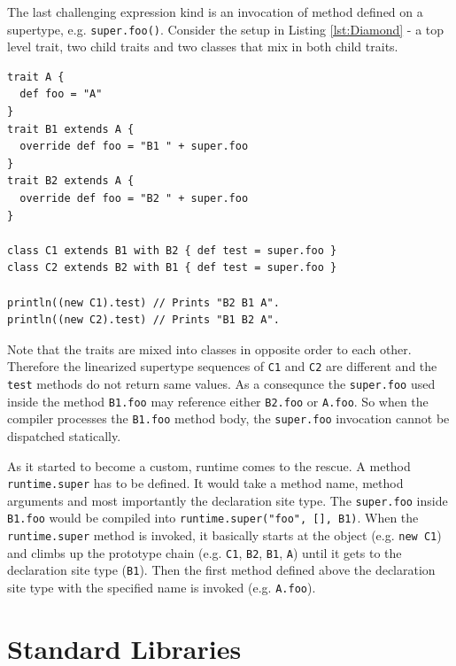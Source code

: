 \documentclass[12pt,a4paper]{report}
\begin{document}
The last challenging expression kind is an invocation of method defined on a supertype, e.g. \texttt{super.foo()}. Consider the setup in Listing \ref{lst:Diamond} - a top level trait, two child traits and two classes that mix in both child traits.

\begin{minipage}{\linewidth}
\begin{lstlisting}[caption={The \texttt{super} keyword non-static behavior example.},label={lst:Diamond}]
trait A { 
  def foo = "A" 
}
trait B1 extends A { 
  override def foo = "B1 " + super.foo
}
trait B2 extends A { 
  override def foo = "B2 " + super.foo
}

class C1 extends B1 with B2 { def test = super.foo }
class C2 extends B2 with B1 { def test = super.foo }

println((new C1).test) // Prints "B2 B1 A".
println((new C2).test) // Prints "B1 B2 A".
\end{lstlisting}
\end{minipage}

Note that the traits are mixed into classes in opposite order to each other. Therefore the linearized supertype sequences of \texttt{C1} and \texttt{C2} are different and the \texttt{test} methods do not return same values. As a consequnce the \texttt{super.foo} used inside the method \texttt{B1.foo} may reference either \texttt{B2.foo} or \texttt{A.foo}. So when the compiler processes the \texttt{B1.foo} method body, the \texttt{super.foo} invocation cannot be dispatched statically.

As it started to become a custom, runtime comes to the rescue. A method \texttt{runtime.super} has to be defined. It would take a method name, method arguments and most importantly the declaration site type. The \texttt{super.foo} inside \texttt{B1.foo} would be compiled into \texttt{runtime.super("foo", [], B1)}. When the \texttt{runtime.super} method is invoked, it basically starts at the object (e.g. \texttt{new C1}) and climbs up the prototype chain (e.g. \texttt{C1}, \texttt{B2}, \texttt{B1}, \texttt{A}) until it gets to the declaration site type (\texttt{B1}). Then the first method defined above the declaration site type with the specified name is invoked (e.g. \texttt{A.foo}).

\section{Standard Libraries}
\end{document}
